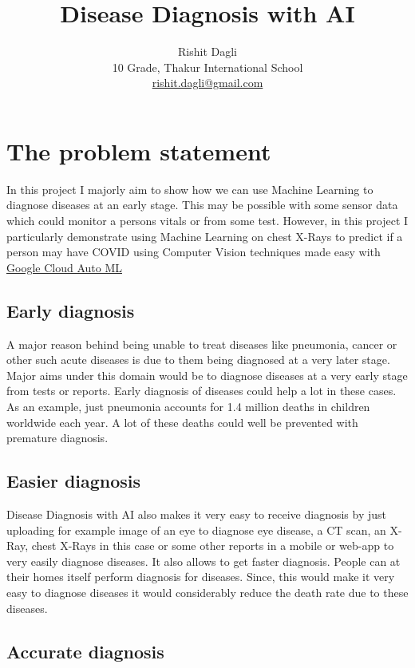 \documentclass[a4paper]{article}
\title{Disease Diagnosis with AI}
\author{Rishit Dagli \\ 
        10 Grade, Thakur International School \\
        \href{mailto:rishit.dagli@gmail.com}{rishit.dagli@gmail.com} }
\date{}
\begin{document}
\maketitle

\section{The problem statement}

In this project I majorly aim to show how we can use Machine Learning to diagnose diseases at an early stage. This may be possible with some sensor data which could monitor a persons vitals or from some test. However, in this project I particularly demonstrate using Machine Learning on chest X-Rays to predict if a person may have COVID using Computer Vision techniques made easy with \href{https://cloud.google.com/automl}{Google Cloud Auto ML}

\subsection{Early diagnosis}

\qquad A major reason behind being unable to treat diseases like pneumonia, cancer or other such acute diseases is due to them being diagnosed at a very later stage. Major aims under this domain would be to diagnose diseases at a very early stage from tests or reports. Early diagnosis of diseases could help a lot in these cases. As an example, just pneumonia accounts for 1.4 million deaths in children worldwide each year. A lot of these deaths could well be prevented with premature diagnosis. 

\subsection{Easier diagnosis}

\qquad Disease Diagnosis with AI also makes it very easy to receive diagnosis by just uploading for example image of an eye to diagnose eye disease, a CT scan, an X-Ray, chest X-Rays in this case or some other reports in a mobile or web-app to very easily diagnose diseases. It also allows to get faster diagnosis. People can at their homes itself perform diagnosis for diseases. Since, this would make it very easy to diagnose diseases it would considerably reduce the death rate due to these diseases.

\subsection{Accurate diagnosis}
\end{document}
